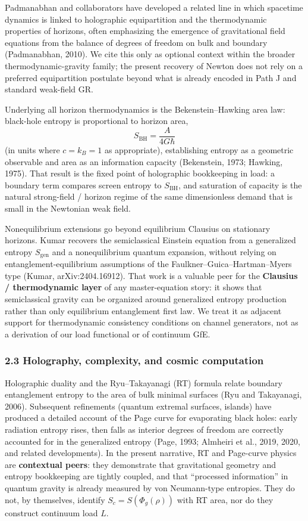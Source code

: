 \documentclass[
  11pt,
]{article}
\newcounter{none} %
\begin{document}
Padmanabhan and collaborators have developed a related line in which
spacetime dynamics is linked to holographic equipartition and the
thermodynamic properties of horizons, often emphasizing the emergence of
gravitational field equations from the balance of degrees of freedom on
bulk and boundary (Padmanabhan, 2010). We cite this only as optional
context within the broader thermodynamic-gravity family; the present
recovery of Newton does not rely on a preferred equipartition postulate
beyond what is already encoded in Path J and standard weak-field GR.

Underlying all horizon thermodynamics is the Bekenstein--Hawking area
law: black-hole entropy is proportional to horizon area, \[
S_{\mathrm{BH}} = \frac{A}{4G\hbar}
\] (in units where \(c=k_B=1\) as appropriate), establishing entropy as
a geometric observable and area as an information capacity (Bekenstein,
1973; Hawking, 1975). That result is the fixed point of holographic
bookkeeping in load: a boundary term compares screen entropy to
\(S_{\mathrm{BH}}\), and saturation of capacity is the natural
strong-field / horizon regime of the same dimensionless demand that is
small in the Newtonian weak field.

Nonequilibrium extensions go beyond equilibrium Clausius on stationary
horizons. Kumar recovers the semiclassical Einstein equation from a
generalized entropy \(S_{\mathrm{gen}}\) and a nonequilibrium quantum
expansion, without relying on entanglement-equilibrium assumptions of
the Faulkner--Guica--Hartman--Myers type (Kumar, arXiv:2404.16912). That
work is a valuable peer for the \textbf{Clausius / thermodynamic layer}
of any master-equation story: it shows that semiclassical gravity can be
organized around generalized entropy production rather than only
equilibrium entanglement first law. We treat it as adjacent support for
thermodynamic consistency conditions on channel generators, not as a
derivation of our load functional or of continuum GfE.

\subsubsection{2.3 Holography, complexity, and cosmic
computation}\label{holography-complexity-and-cosmic-computation}

Holographic duality and the Ryu--Takayanagi (RT) formula relate boundary
entanglement entropy to the area of bulk minimal surfaces (Ryu and
Takayanagi, 2006). Subsequent refinements (quantum extremal surfaces,
islands) have produced a detailed account of the Page curve for
evaporating black holes: early radiation entropy rises, then falls as
interior degrees of freedom are correctly accounted for in the
generalized entropy (Page, 1993; Almheiri et al., 2019, 2020, and
related developments). In the present narrative, RT and Page-curve
physics are \textbf{contextual peers}: they demonstrate that
gravitational geometry and entropy bookkeeping are tightly coupled, and
that ``processed information'' in quantum gravity is already measured by
von Neumann-type entropies. They do not, by themselves, identify
\(S_c = S(\Phi_g(\rho))\) with RT area, nor do they construct continuum
load \(L\).
\end{document}
